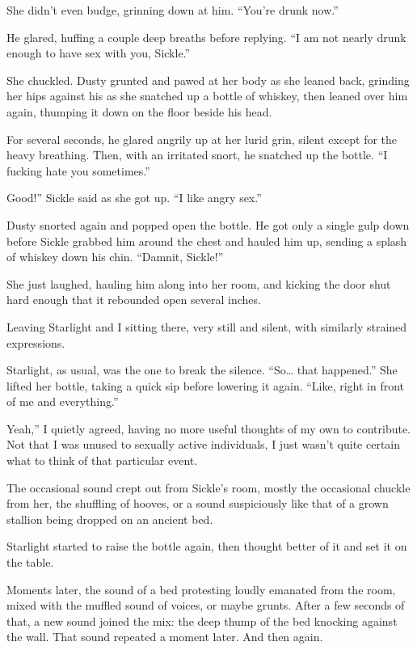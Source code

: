 She didn’t even budge, grinning down at him. “You’re drunk now.”

He glared, huffing a couple deep breaths before replying. “I am not nearly drunk enough to have sex with you, Sickle.”

She chuckled. Dusty grunted and pawed at her body as she leaned back, grinding her hips against his as she snatched up a bottle of whiskey, then leaned over him again, thumping it down on the floor beside his head.

For several seconds, he glared angrily up at her lurid grin, silent except for the heavy breathing. Then, with an irritated snort, he snatched up the bottle. “I fucking hate you sometimes.”

\leavevmode{}Good!” Sickle said as she got up. “I like angry sex.”

Dusty snorted again and popped open the bottle. He got only a single gulp down before Sickle grabbed him around the chest and hauled him up, sending a splash of whiskey down his chin. “Damnit, Sickle!”

She just laughed, hauling him along into her room, and kicking the door shut hard enough that it rebounded open several inches.

Leaving Starlight and I sitting there, very still and silent, with similarly strained expressions.

Starlight, as usual, was the one to break the silence. “So… that happened.” She lifted her bottle, taking a quick sip before lowering it again. “Like, right in front of me and everything.”

\leavevmode{}Yeah,” I quietly agreed, having no more useful thoughts of my own to contribute. Not that I was unused to sexually active individuals, I just wasn’t quite certain what to think of that particular event.

The occasional sound crept out from Sickle’s room, mostly the occasional chuckle from her, the shuffling of hooves, or a sound suspiciously like that of a grown stallion being dropped on an ancient bed.

Starlight started to raise the bottle again, then thought better of it and set it on the table.

Moments later, the sound of a bed protesting loudly emanated from the room, mixed with the muffled sound of voices, or maybe grunts. After a few seconds of that, a new sound joined the mix: the deep thump of the bed knocking against the wall. That sound repeated a moment later. And then again.

